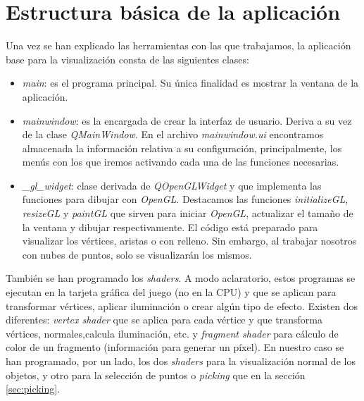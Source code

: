 \section{Estructura básica de la aplicación}\label{sec:estrucBasic}
Una vez se han explicado las herramientas con las que trabajamos, la aplicación base para la visualización consta de las siguientes clases:

\begin{itemize}
\item \textit{main}: es el programa principal. Su única finalidad es mostrar la ventana de la aplicación.
\item \textit{mainwindow}: es la encargada de crear la interfaz de usuario. Deriva a su vez de la clase \textit{QMainWindow}. En el archivo \textit{mainwindow.ui} encontramos almacenada la información relativa a su configuración, principalmente, los menús con los que iremos activando cada una de las funciones necesarias. 
\item \textit{\_gl\_widget}: clase derivada de \textit{QOpenGLWidget} y que implementa las funciones para dibujar con \textit{OpenGL}. Destacamos las funciones \textit{initializeGL}, \textit{resizeGL} y \textit{paintGL} que sirven para iniciar \textit{OpenGL}, actualizar el tamaño de la ventana y dibujar respectivamente. El código está preparado para visualizar los vértices, aristas o con relleno. Sin embargo, al trabajar nosotros con nubes de puntos, solo se visualizarán los mismos.
\end{itemize}

También se han programado los \textit{shaders}. A modo aclaratorio, estos programas se ejecutan en la tarjeta gráfica del juego (no en la CPU) y que se aplican para transformar vértices, aplicar iluminación o crear algún tipo de efecto. Existen dos diferentes: \textit{vertex shader} que se aplica para cada vértice y que transforma vértices, normales,calcula iluminación, etc. y \textit{fragment shader} para cálculo de color de un fragmento (información para generar un píxel). En nuestro caso se han programado, por un lado, los dos \textit{shaders} para la visualización normal de los objetos, y otro para la selección de puntos o \textit{picking} que en la sección \ref{sec:picking}.\\

